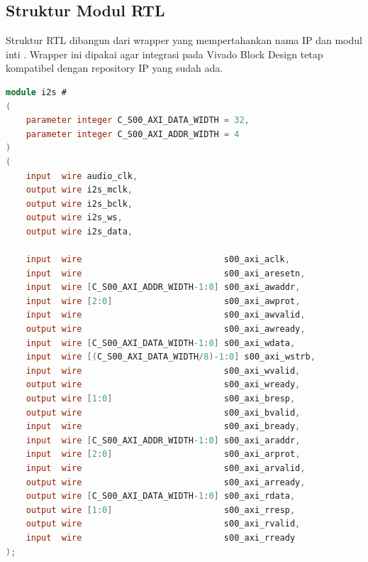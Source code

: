 \subsection{Struktur Modul RTL}

Struktur RTL dibangun dari wrapper yang mempertahankan nama IP  dan modul inti . Wrapper ini dipakai agar integrasi pada Vivado Block Design tetap kompatibel dengan repository IP yang sudah ada.

\begin{lstlisting}[language=Verilog,caption={Wrapper IP \texttt{i2s.v} yang meneruskan antarmuka AXI4-Lite dan keluaran I2S ke core.},label={lst:ch4-wrapper}]
module i2s #
(
    parameter integer C_S00_AXI_DATA_WIDTH = 32,
    parameter integer C_S00_AXI_ADDR_WIDTH = 4
)
(
    input  wire audio_clk,
    output wire i2s_mclk,
    output wire i2s_bclk,
    output wire i2s_ws,
    output wire i2s_data,

    input  wire                            s00_axi_aclk,
    input  wire                            s00_axi_aresetn,
    input  wire [C_S00_AXI_ADDR_WIDTH-1:0] s00_axi_awaddr,
    input  wire [2:0]                      s00_axi_awprot,
    input  wire                            s00_axi_awvalid,
    output wire                            s00_axi_awready,
    input  wire [C_S00_AXI_DATA_WIDTH-1:0] s00_axi_wdata,
    input  wire [(C_S00_AXI_DATA_WIDTH/8)-1:0] s00_axi_wstrb,
    input  wire                            s00_axi_wvalid,
    output wire                            s00_axi_wready,
    output wire [1:0]                      s00_axi_bresp,
    output wire                            s00_axi_bvalid,
    input  wire                            s00_axi_bready,
    input  wire [C_S00_AXI_ADDR_WIDTH-1:0] s00_axi_araddr,
    input  wire [2:0]                      s00_axi_arprot,
    input  wire                            s00_axi_arvalid,
    output wire                            s00_axi_arready,
    output wire [C_S00_AXI_DATA_WIDTH-1:0] s00_axi_rdata,
    output wire [1:0]                      s00_axi_rresp,
    output wire                            s00_axi_rvalid,
    input  wire                            s00_axi_rready
);


\end{lstlisting}
